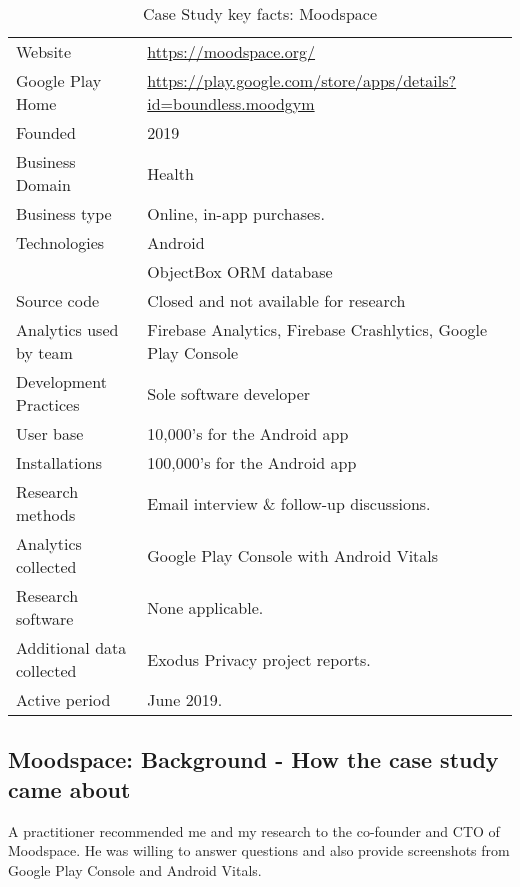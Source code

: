 {\renewcommand{\arraystretch}{0.8}%
\begin{table}[htbp!]
    \centering
    \small
    \setlength{\tabcolsep}{6pt}
    \begin{tabular}{lp{9cm}}
       \toprule
       Website &\url{https://moodspace.org/} \\
       Google Play Home & \url{https://play.google.com/store/apps/details?id=boundless.moodgym} \\
       Founded & 2019 \\
       Business Domain & Health \\
       Business type & Online, in-app purchases. \\
       Technologies  & Android \\
       & ObjectBox ORM database \\
       Source code  &Closed and not available for research \\
       Analytics used by team & Firebase Analytics, Firebase Crashlytics, Google Play Console \\
       Development Practices & Sole software developer \\
       \midrule
       User base & 10,000's for the Android app \\
       Installations & 100,000's for the Android app \\
       \midrule
       Research methods &Email interview \& follow-up discussions. \\
       Analytics collected &Google Play Console with Android Vitals \\
       Research software & None applicable. \\
       Additional data collected &Exodus Privacy project reports. \\
       Active period & June 2019. \\
       \bottomrule
    \end{tabular}
    \caption{Case Study key facts: Moodspace}
    \label{tab:blank_case_study_anaytics_overview}
\end{table}
}

\subsection{Moodspace: Background - How the case study came about}
A practitioner recommended me and my research to the co-founder and CTO of Moodspace. He was willing to answer questions and also provide screenshots from Google Play Console and Android Vitals.


